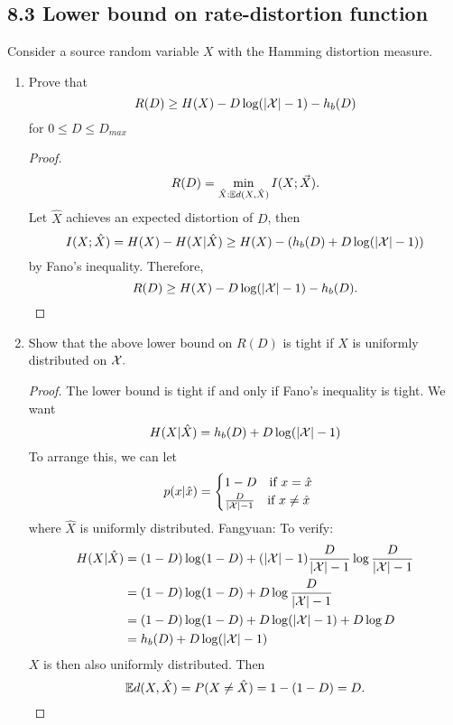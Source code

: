 \documentclass[../main.tex]{subfiles}
\begin{document}
\subsection*{8.3 Lower bound on rate-distortion function}
Consider a source random variable $X$ with the Hamming distortion measure.
\begin{enumerate}
    \item Prove that \[
    R(D)\geq H(X) - D\log (|\mathcal{X}|-1)-h_b(D)
    \] for $0\leq D\leq D_{max}$
    \begin{proof}
        \[
        R(D) = \min_{\hat X:\mathbb{E} d(X,\hat X)} I(X;\vec X).
        \]
        Let $\hat X$ achieves an expected distortion of $D$, then \[
        I(X;\hat X) = H(X) - H(X|\hat X) \geq H(X) - (h_b(D)+D\log(|\mathcal{X}|-1))
        \] by Fano's inequality. Therefore, \[
        R(D) \geq H(X) - D\log(|\mathcal{X}|-1)-h_b(D).
        \]
    \end{proof}
    \item Show that the above lower bound on $R(D)$ is tight if $X$ is uniformly distributed on $\mathcal{X}.$
    \begin{proof}
        The lower bound is tight if and only if Fano's inequality is tight. 
        \newline
        We want \[
        H(X|\hat X) = h_b(D)+D\log(|\mathcal{X}|-1)
        \]
        To arrange this, we can let \[
        p(x|\hat x) =\begin{cases}
            1- D \quad \text{if $x=\hat x$}\\
            \frac{D}{|\mathcal{X}|-1} \quad \text{if $x\neq \hat x$}
        \end{cases}
        \] where $\hat X$ is uniformly distributed. 
        Fangyuan: To verify:
        \begin{align*}
            H(X|\hat X) &= (1-D)\log (1-D) + (|\mathcal{X}|-1)\frac{D}{|\mathcal{X}|-1}\log \frac{D}{|\mathcal{X}|-1}\\
            &=(1-D)\log (1-D) + D\log\frac{D}{|\mathcal{X}|-1}\\
            &=(1-D)\log (1-D) + D\log (|\mathcal{X}|-1) + D\log D\\
            &= h_b(D) + D\log(|\mathcal{X}|-1)
        \end{align*}
        $X$ is then also uniformly distributed.
        Then \[\mathbb{E} d(X,\hat X)=P(X\neq \hat X) =1-(1-D)= D.\]
    \end{proof}
\end{enumerate}
\end{document}
